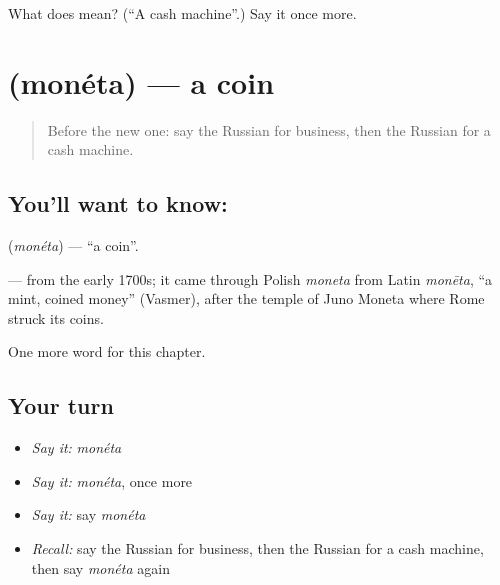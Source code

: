 \begin{tcolorbox}[breakable,colback=teal!4,colframe=teal!35!black,title={Before you move on}]
What does  mean? (\textquotedblleft{}A cash machine\textquotedblright{}.) Say it once more.
\end{tcolorbox}
\section[\texorpdfstring{\ru{монета} (monéta)}{монета (monéta)}]{ (monéta) — a coin}

\label{lesson:RU-C203-moneta}



\begin{quote}
Before the new one: say the Russian for business, then the Russian for a cash machine.
\end{quote}

\subsection*{You'll want to know: }
\textbf{} (\emph{monéta}) — \textquotedblleft{}a coin\textquotedblright{}.

\begin{cousinweb}
\textbf{} — from the early 1700s; it came through Polish \emph{moneta} from Latin \emph{monēta}, \textquotedblleft{}a mint, coined money\textquotedblright{} (Vasmer), after the temple of Juno Moneta where Rome struck its coins.
\end{cousinweb}

\begin{grammarlens}[title={What you've built}]
One more word for this chapter.
\end{grammarlens}

\subsection*{Your turn}
\begin{itemize}
\raggedright
  \item \emph{Say it:} \emph{monéta}
  \item \emph{Say it:} \emph{monéta}, once more
  \item \emph{Say it:} say \emph{monéta}
  \item \emph{Recall:} say the Russian for business, then the Russian for a cash machine, then say \emph{monéta} again
\end{itemize}

